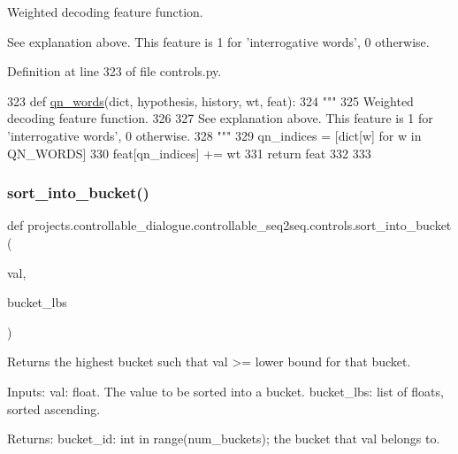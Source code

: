 \begin{DoxyVerb}Weighted decoding feature function.

See explanation above. This feature is 1 for 'interrogative words', 0 otherwise.
\end{DoxyVerb}
 

Definition at line 323 of file controls.\+py.


\begin{DoxyCode}
323 \textcolor{keyword}{def }\hyperlink{namespaceprojects_1_1controllable__dialogue_1_1controllable__seq2seq_1_1controls_ac09ae7183b65c9bd1f6f1469db84012b}{qn\_words}(dict, hypothesis, history, wt, feat):
324     \textcolor{stringliteral}{"""}
325 \textcolor{stringliteral}{    Weighted decoding feature function.}
326 \textcolor{stringliteral}{}
327 \textcolor{stringliteral}{    See explanation above. This feature is 1 for 'interrogative words', 0 otherwise.}
328 \textcolor{stringliteral}{    """}
329     qn\_indices = [dict[w] \textcolor{keywordflow}{for} w \textcolor{keywordflow}{in} QN\_WORDS]
330     feat[qn\_indices] += wt
331     \textcolor{keywordflow}{return} feat
332 
333 
\end{DoxyCode}
\mbox{\label{namespaceprojects_1_1controllable__dialogue_1_1controllable__seq2seq_1_1controls_a10bd268a01b2a8886d5af4358cd5e922}} 
\subsubsection{\texorpdfstring{sort\+\_\+into\+\_\+bucket()}{sort\_into\_bucket()}}
{\footnotesize\ttfamily def projects.\+controllable\+\_\+dialogue.\+controllable\+\_\+seq2seq.\+controls.\+sort\+\_\+into\+\_\+bucket (\begin{DoxyParamCaption}\item[{}]{val,  }\item[{}]{bucket\+\_\+lbs }\end{DoxyParamCaption})}

\begin{DoxyVerb}Returns the highest bucket such that val >= lower bound for that bucket.

Inputs:
  val: float. The value to be sorted into a bucket.
  bucket_lbs: list of floats, sorted ascending.

Returns:
  bucket_id: int in range(num_buckets); the bucket that val belongs to.
\end{DoxyVerb}
 

